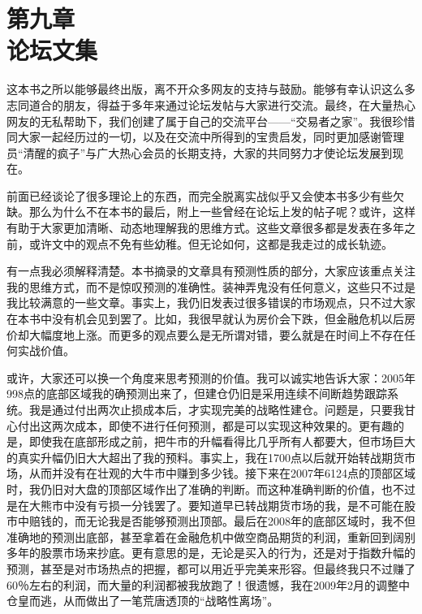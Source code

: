 \setcounter{figure}{0}
\renewcommand{\thefigure}{9-\arabic{figure}}

\section[第九章\q 论坛文集]{第九章\\ 论坛文集}

这本书之所以能够最终出版，离不开众多网友的支持与鼓励。能够有幸认识这么多志同道合的朋友，得益于多年来通过论坛发帖与大家进行交流。最终，在大量热心网友的无私帮助下，我们创建了属于自己的交流平台——“交易者之家”。我很珍惜同大家一起经历过的一切，以及在交流中所得到的宝贵启发，同时更加感谢管理员“清醒的疯子”与广大热心会员的长期支持，大家的共同努力才使论坛发展到现在。

前面已经谈论了很多理论上的东西，而完全脱离实战似乎又会使本书多少有些欠缺。那么为什么不在本书的最后，附上一些曾经在论坛上发的帖子呢？或许，这样有助于大家更加清晰、动态地理解我的思维方式。这些文章很多都是发表在多年之前，或许文中的观点不免有些幼稚。但无论如何，这都是我走过的成长轨迹。

有一点我必须解释清楚。本书摘录的文章具有预测性质的部分，大家应该重点关注我的思维方式，而不是惊叹预测的准确性。装神弄鬼没有任何意义，这些只不过是我比较满意的一些文章。事实上，我仍旧发表过很多错误的市场观点，只不过大家在本书中没有机会见到罢了。比如，我很早就认为房价会下跌，但金融危机以后房价却大幅度地上涨。而更多的观点要么是无所谓对错，要么就是在时间上不存在任何实战价值。

或许，大家还可以换一个角度来思考预测的价值。我可以诚实地告诉大家：2005年998点的底部区域我的确预测出来了，但建仓仍旧是采用连续不间断趋势跟踪系统。我是通过付出两次止损成本后，才实现完美的战略性建仓。问题是，只要我甘心付出这两次成本，即使不进行任何预测，都是可以实现这种效果的。更有趣的是，即使我在底部形成之前，把牛市的升幅看得比几乎所有人都要大，但市场巨大的真实升幅仍旧大大超出了我的预料。事实上，我在1700点以后就开始转战期货市场，从而并没有在壮观的大牛市中赚到多少钱。接下来在2007年6124点的顶部区域时，我仍旧对大盘的顶部区域作出了准确的判断。而这种准确判断的价值，也不过是在大熊市中没有亏损一分钱罢了。要知道早已转战期货市场的我，是不可能在股市中赔钱的，而无论我是否能够预测出顶部。最后在2008年的底部区域时，我不但准确地的预测出底部，甚至拿着在金融危机中做空商品期货的利润，重新回到阔别多年的股票市场来抄底。更有意思的是，无论是买入的行为，还是对于指数升幅的预测，甚至是对市场热点的把握，都可以用近乎完美来形容。但最终我只不过赚了60％左右的利润，而大量的利润都被我放跑了！很遗憾，我在2009年2月的调整中仓皇而逃，从而做出了一笔荒唐透顶的“战略性离场”。

